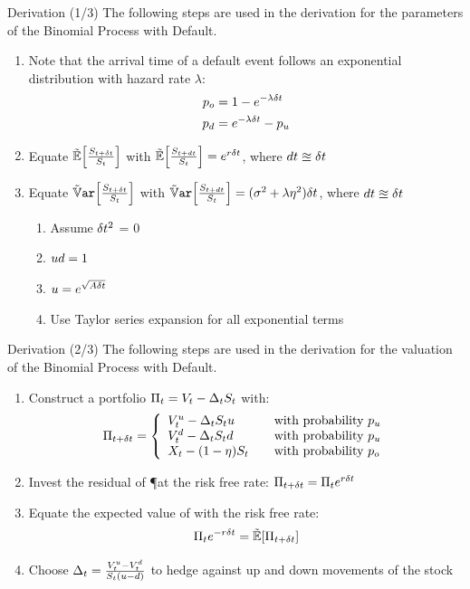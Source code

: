 \documentclass{beamer}
\begin{document}
\begin{frame}{Derivation (1/3)}
The following steps are used in the derivation for the parameters of the Binomial Process with Default.
\begin{enumerate}
 \item Note that the arrival time of a default event follows an exponential distribution with hazard rate $\lambda$:
       \begin{align}
        p_o &= 1 - e^{-\lambda\delta t} \\
        p_d &= e^{-\lambda\delta t} - p_u
       \end{align}
 \item Equate $\E[\frac{\SDt}{\S}]$ with $\E[\frac{\Sdt}{\S}] = e^{r\Dt}$, where $dt \approxeq \delta t$
 \item Equate $\Var[\frac{\SDt}{\S}]$ with $\Var[\frac{\Sdt}{\S}] = (\sigma^2 + \lambda\eta^2)\Dt$, where $dt \approxeq \delta t$
       \begin{enumerate}
        \item Assume $\delta t^2$ = 0
        \item $ud = 1$
        \item $u = e^{\sqrt{A\delta t}}$
        \item Use Taylor series expansion for all exponential terms
       \end{enumerate}
\end{enumerate}
\end{frame}

\begin{frame}{Derivation (2/3)}
The following steps are used in the derivation for the valuation of the Binomial Process with Default.
\begin{enumerate}
 \item Construct a portfolio $\Pi_t = V_t - \Delta_tS_t$ with:
       \begin{equation}
        \PDt = \left\{
                \begin{array}{l@{\qquad\mbox{with probability }}l}
                 \Vu - \D\S\u      & \pu \\
                 \Vd - \D\S\d      & \pu \\
                 \X - (1 - \eta)\S & \po
                \end{array}\right.
       \end{equation}
 \item Invest the residual of \P at the risk free rate: $\Pi_{t + \delta t} = \Pi_t e^{r\delta t}$
 \item Equate the expected value of \PDt with the risk free rate:
       \begin{align}
        \P e^{-r\Dt} = \E[\PDt]
       \end{align}
 \item Choose $\Delta_t = \frac{V^{u}_t - V^{d}_t}{S_t(u - d)}$ to hedge against up and down movements of the stock
\end{enumerate}
\end{frame}
\end{document}
